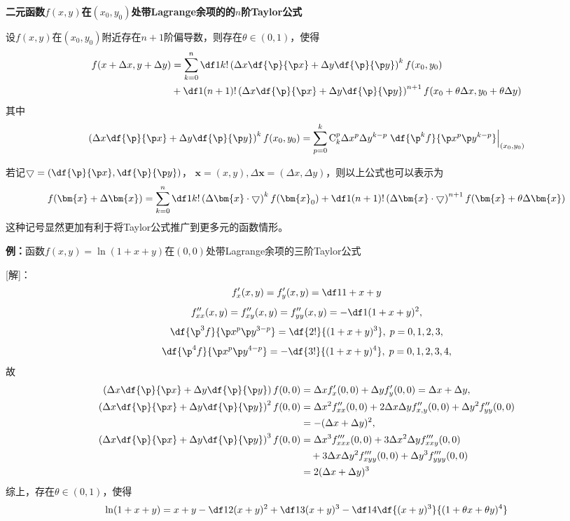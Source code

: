 \begin{shaded}
	{\bf 二元函数$f(x,y)$在$(x_0,y_0)$处带Lagrange余项的的$n$阶Taylor公式}
	
	设$f(x,y)$在$(x_0,y_0)$附近存在$n+1$阶偏导数，则存在$\theta\in(0,1)$，使得
	\begin{align*}
		f(x+\Delta x,y+\Delta y)&=\sum\limits_{k=0}^n
		\df1{k!}\left(\Delta x\df{\p}{\p x}+\Delta y\df{\p}{\p y}\right)^kf(x_0,y_0)\\
		&+\df1{(n+1)!}\left(\Delta x\df{\p}{\p x}+\Delta y\df{\p}{\p y}\right)
		^{n+1}f(x_0+\theta\Delta x,y_0+\theta\Delta y)
	\end{align*}
	其中
	$$\left(\Delta x\df{\p}{\p x}+\Delta y\df{\p}{\p y}\right)^kf(x_0,y_0)
	=\sum\limits_{p=0}^k\mathrm{C}_k^p\Delta x^p\Delta y^{k-p}
	\left.\df{\p^kf}{\p x^p\p y^{k-p}}\right|_{(x_0,y_0)}$$
	
	若记$\bigtriangledown=\left(\df{\p}{\p x},\df{\p}{\p y}\right)$，
	$\bm{x}=(x,y),\Delta\bm{x}=(\Delta x,\Delta y)$，则以上公式也可以表示为
	$$f(\bm{x}+\Delta\bm{x})=\sum\limits_{k=0}^n
	\df1{k!}\left(\Delta\bm{x}
	\cdot\bigtriangledown\right)^kf(\bm{x}_0)+\df1{(n+1)!}
	\left(\Delta\bm{x}\cdot\bigtriangledown\right)^{n+1}f(
	\bm{x}+\theta\Delta\bm{x})$$
	这种记号显然更加有利于将Taylor公式推广到更多元的函数情形。
	
	{\bf 例：}函数$f(x,y)=\ln(1+x+y)$在$(0,0)$处带Lagrange余项的三阶Taylor公式
	
	[解]：
	$$f'_x(x,y)=f'_y(x,y)=\df1{1+x+y}$$
	$$f''_{xx}(x,y)=f''_{xy}(x,y)=f''_{yy}(x,y)=-\df1{(1+x+y)^2},$$
	$$\df{\p^3f}{\p x^p\p y^{3-p}}=\df{2!}{(1+x+y)^3},\;p=0,1,2,3,$$
	$$\df{\p^4f}{\p x^p\p y^{4-p}}=-\df{3!}{(1+x+y)^4},\;p=0,1,2,3,4,$$
	故
	\begin{align*}
		\left(\Delta x\df{\p}{\p x}+\Delta y\df{\p}{\p y}\right)f(0,0)
		&=\Delta xf'_x(0,0)+\Delta yf'_y(0,0)
		=\Delta x+\Delta y,\\
		\left(\Delta x\df{\p}{\p x}+\Delta y\df{\p}{\p y}\right)^2f(0,0)
		&=\Delta x^2f''_{xx}(0,0)+2\Delta x\Delta yf''_{x,y}(0,0)
		+\Delta y^2f''_{yy}(0,0)\\
		&=-(\Delta x+\Delta y)^2,\\
		\left(\Delta x\df{\p}{\p x}+\Delta y\df{\p}{\p y}\right)^3f(0,0)
		&=\Delta x^3f'''_{xxx}(0,0)+3\Delta x^2\Delta yf'''_{xxy}(0,0)\\
		&\quad +3\Delta x\Delta y^2f'''_{xyy}(0,0)+\Delta y^3f'''_{yyy}(0,0)\\
		&=2(\Delta x+\Delta y)^3
	\end{align*}
	综上，存在$\theta\in(0,1)$，使得
	$$\ln(1+x+y)=x+y-\df12(x+y)^2+\df13(x+y)^3-\df14\df{(x+y)^3}
	{(1+\theta x+\theta y)^4}$$
\end{shaded}

